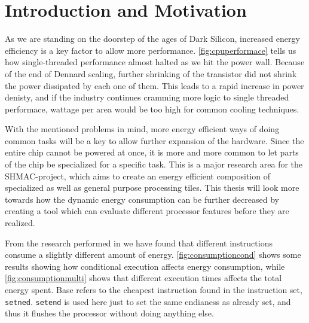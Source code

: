 \section{Introduction and Motivation}







As we are standing on the doorstep of the ages of Dark Silicon, increased energy
efficiency is a key factor to allow more performance.
\autoref{fig:cpuperformace} tells us how single-threaded performance almost
halted as we hit the power wall. Because of the end of Dennard scaling, further
shrinking of the transistor did not shrink the power dissipated by each one of
them. This leads to a rapid increase in power denisty, and if the industry
continues cramming more logic to single threaded performace, wattage per area
would be too high for common cooling techniques.

With the mentioned problems in mind, more energy efficient ways of doing common
tasks will be a key to allow further expansion of the hardware.  Since the
entire chip cannot be powered at once, it is more and more common to let parts
of the chip be specialized for a specific task. This is a major research area
for the SHMAC-project, which aims to create an energy efficient composition of
specialized as well as general purpose processing tiles. This thesis will
look more towards how the dynamic energy consumption can be further decreased
by creating a tool which can evaluate different processor features before they
are realized.

From the research performed in \cite{rundehvatum2013exploring} we have found
that different instructions consume a slightly different amount of energy.
\autoref{fig:consumptioncond} shows some results showing how conditional
execution affects energy consumption, while \autoref{fig:consumptionmulti}
shows that different execution times affects the total energy spent. Base
refers to the cheapest instruction found in the instruction set, \texttt{setned}.
\texttt{setend} is used here just to set the same endianess as already set,
and thus it flushes the processor without doing anything else.


